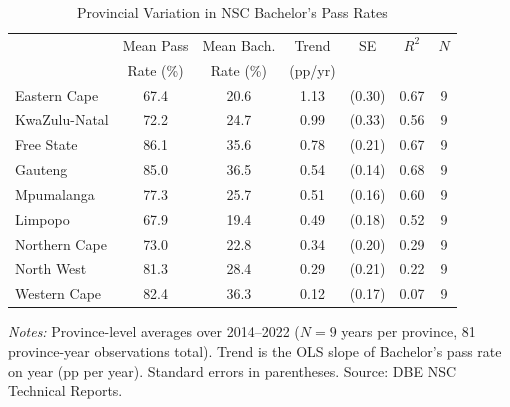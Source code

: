 \begin{table}[H]
\centering
\caption{Provincial Variation in NSC Bachelor's Pass Rates}
\label{tab:province}
\begin{threeparttable}
\begin{tabular}{lcccccc}
\toprule
 & Mean Pass & Mean Bach. & Trend & SE & $R^2$ & $N$ \\
 & Rate (\%) & Rate (\%) & (pp/yr) & & & \\
\midrule
Eastern Cape & 67.4 & 20.6 & 1.13 & (0.30) & 0.67 & 9 \\
KwaZulu-Natal & 72.2 & 24.7 & 0.99 & (0.33) & 0.56 & 9 \\
Free State & 86.1 & 35.6 & 0.78 & (0.21) & 0.67 & 9 \\
Gauteng & 85.0 & 36.5 & 0.54 & (0.14) & 0.68 & 9 \\
Mpumalanga & 77.3 & 25.7 & 0.51 & (0.16) & 0.60 & 9 \\
Limpopo & 67.9 & 19.4 & 0.49 & (0.18) & 0.52 & 9 \\
Northern Cape & 73.0 & 22.8 & 0.34 & (0.20) & 0.29 & 9 \\
North West & 81.3 & 28.4 & 0.29 & (0.21) & 0.22 & 9 \\
Western Cape & 82.4 & 36.3 & 0.12 & (0.17) & 0.07 & 9 \\
\bottomrule
\end{tabular}
\begin{tablenotes}[flushleft]
\small
\item \textit{Notes:} Province-level averages over 2014--2022 ($N = 9$ years per province, 81 province-year observations total). Trend is the OLS slope of Bachelor's pass rate on year (pp per year). Standard errors in parentheses. Source: DBE NSC Technical Reports.
\end{tablenotes}
\end{threeparttable}
\end{table}
